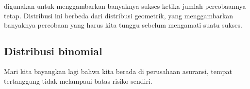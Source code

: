 digunakan untuk menggambarkan banyaknya sukses ketika jumlah percobaannya
tetap.
Distribusi ini berbeda dari distribusi geometrik, yang menggambarkan
banyaknya percobaan yang harus kita tunggu sebelum mengamati suatu sukses.


\subsection{Distribusi binomial}

\newcommand{\insureS}{\resp{tidak}}
\newcommand{\insureF}{\resp{melampaui}}
\newcommand{\insureBinomCinDSingleScenario}{0.103}
\newcommand{\insureBinomCinD}{0.412}
\newcommand{\insureBinomEinHSingleScenario}{0.00454}
\newcommand{\insureBinomEinH}{0.254}
\newcommand{\insureBinomFourtyExpValue}{28}
\newcommand{\insureBinomFourtySD}{2.9}
\newcommand{\insureBinomFourtyLower}{22}
\newcommand{\insureBinomFourtyUpper}{34}

\noindent%
Mari kita bayangkan lagi bahwa kita berada di perusahaan asuransi,
tempat \insureSperc{} tertanggung tidak melampaui batas risiko sendiri.


